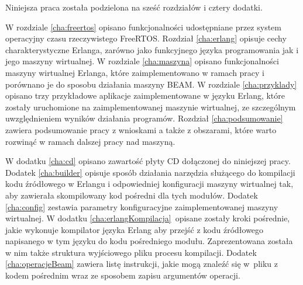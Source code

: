 Niniejsza praca została podzielona na sześć rozdziałów i cztery dodatki.

W rozdziale \ref{cha:freertos} opisano funkcjonalności udostępniane przez system operacyjny czasu rzeczywistego FreeRTOS.
Rozdział \ref{cha:erlang} opisuje cechy charakterystyczne Erlanga, zarówno jako funkcyjnego języka programowania jak i jego maszyny wirtualnej.
W rozdziale \ref{cha:maszyna} opisano funkcjonalności maszyny wirtualnej Erlanga, które zaimplementowano w ramach pracy i porównano je do sposobu działania maszyny BEAM.
W rozdziale \ref{cha:przyklady} opisano trzy przykładowe aplikacje zaimplementowane w języku Erlang, które zostały uruchomione na zaimplementowanej maszynie wirtualnej, ze szczególnym uwzględnieniem wyników działania programów.
Rozdział \ref{cha:podsumowanie} zawiera podsumowanie pracy z wnioskami a także z obszarami, które warto rozwinąć w ramach dalszej pracy nad maszyną.

W dodatku \ref{cha:cd} opisano zawartość płyty CD dołączonej do niniejszej pracy.
Dodatek \ref{cha:builder} opisuje sposób działania narzędzia służącego do kompilacji kodu źródłowego w Erlangu i odpowiedniej konfiguracji maszyny wirtualnej tak, aby zawierała skompilowany kod pośredni dla tych modułów.
Dodatek \ref{cha:config} zestawia parametry konfiguracyjne zaimplementowanej maszyny wirtualnej.
W dodatku \ref{cha:erlangKompilacja}~opisane zostały kroki pośrednie, jakie wykonuje kompilator języka Erlang aby przejść z kodu źródłowego napisanego w tym języku do kodu pośredniego modułu. Zaprezentowana została w nim także struktura wyjściowego pliku procesu kompilacji.
Dodatek \ref{cha:operacjeBeam} zawiera listę instrukcji, jakie mogą znaleźć się w~pliku z kodem pośrednim wraz ze sposobem zapisu argumentów operacji.

